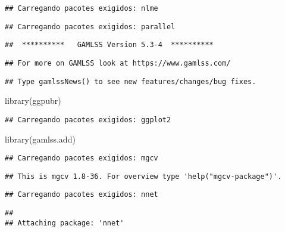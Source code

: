 \documentclass[
]{article}
\newenvironment{Shaded}{\begin{snugshade}}{\end{snugshade}}
\newcommand{\FunctionTok}[1]{\textcolor[rgb]{0.00,0.00,0.00}{#1}}
\newcommand{\NormalTok}[1]{#1}
\begin{document}
\begin{verbatim}
## Carregando pacotes exigidos: nlme
\end{verbatim}

\begin{verbatim}
## Carregando pacotes exigidos: parallel
\end{verbatim}

\begin{verbatim}
##  **********   GAMLSS Version 5.3-4  **********
\end{verbatim}

\begin{verbatim}
## For more on GAMLSS look at https://www.gamlss.com/
\end{verbatim}

\begin{verbatim}
## Type gamlssNews() to see new features/changes/bug fixes.
\end{verbatim}

\begin{Shaded}
\begin{Highlighting}[]
\FunctionTok{library}\NormalTok{(ggpubr)}
\end{Highlighting}
\end{Shaded}

\begin{verbatim}
## Carregando pacotes exigidos: ggplot2
\end{verbatim}

\begin{Shaded}
\begin{Highlighting}[]
\FunctionTok{library}\NormalTok{(gamlss.add)}
\end{Highlighting}
\end{Shaded}

\begin{verbatim}
## Carregando pacotes exigidos: mgcv
\end{verbatim}

\begin{verbatim}
## This is mgcv 1.8-36. For overview type 'help("mgcv-package")'.
\end{verbatim}

\begin{verbatim}
## Carregando pacotes exigidos: nnet
\end{verbatim}

\begin{verbatim}
## 
## Attaching package: 'nnet'
\end{verbatim}
\end{document}
